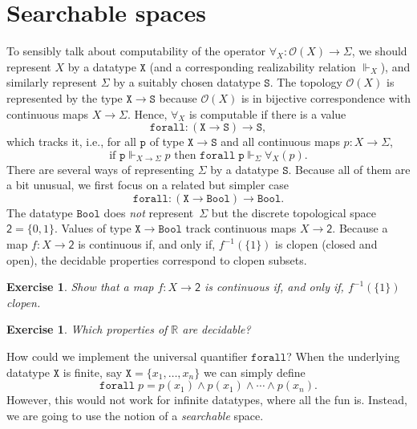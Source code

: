 \documentclass[a4paper,10pt]{article}
\newtheorem{exercise}[theorem]{Exercise}
\newcommand{\RR}{\mathbb{R}}
\newcommand{\set}[1]{\{#1\}}
\newcommand{\tpl}[1]{\mathcal{O}(#1)}
\newcommand{\two}{\mathsf{2}}
\newcommand{\Bool}{\mathtt{Bool}}
\newcommand{\R}[1]{\mathtt{#1}}
\newcommand{\rz}{\Vdash}
\begin{document}
\section{Searchable spaces}
\label{sec:searchable-spaces}

To sensibly talk about computability of the operator $\forall_X :
\tpl{X} \to \Sigma$, we should represent $X$ by a datatype
$\mathtt{X}$ (and a corresponding realizability relation $\rz_X$), and
similarly represent $\Sigma$ by a suitably chosen datatype
$\mathtt{S}$. The topology $\tpl{X}$ is represented by the type
$\mathtt{X} \to \mathtt{S}$ because $\tpl{X}$ is in bijective
correspondence with continuous maps $X \to \Sigma$. Hence, $\forall_X$
is computable if there is a value
%
\begin{equation*}
  \R{forall} : (\mathtt{X} \to \mathtt{S}) \to \mathtt{S},
\end{equation*}
%
which tracks it, i.e., for all $\R{p}$ of type $\mathtt{X} \to
\mathtt{S}$ and all continuous maps $p : X \to \Sigma$,
%
\begin{equation*}
  \text{if $\R{p} \rz_{X \to \Sigma} p$ then $\R{forall}\;\R{p}
    \rz_\Sigma \forall_X(p)$.}
\end{equation*}
%
There are several ways of representing $\Sigma$ by a datatype
$\mathtt{S}$. Because all of them are a bit unusual, we first focus on
a related but simpler case
%
\begin{equation}
  \label{eq:forall-bool}
  \mathtt{forall} : (\mathtt{X} \to \Bool) \to \Bool.
\end{equation}
%
The datatype $\Bool$ does \emph{not} represent~$\Sigma$ but the
discrete topological space $\two = \set{0, 1}$. Values of type
$\mathtt{X} \to \Bool$ track continuous maps $X \to \two$. Because a
map $f : X \to \two$ is continuous if, and only if, $f^{-1}(\set{1})$
is clopen (closed and open), the decidable properties correspond to
clopen subsets.

\begin{exercise}
  Show that a map $f : X \to \two$ is continuous if, and only if,
  $f^{-1}(\set{1})$ clopen.
\end{exercise}

\begin{exercise}
  Which properties of $\RR$ are decidable?
\end{exercise}
%
How could we implement the universal quantifier $\mathtt{forall}$?
When the underlying datatype $\mathtt{X}$ is finite, say $\mathtt{X} =
\set{x_1, \ldots, x_n}$ we can simply define
%
\begin{equation*}
  \mathtt{forall}\; p = p(x_1) \land p(x_1) \land \cdots \land p(x_n).
\end{equation*}
%
However, this would not work for infinite datatypes, where all the fun
is. Instead, we are going to use the notion of a \emph{searchable} space.
\end{document}
